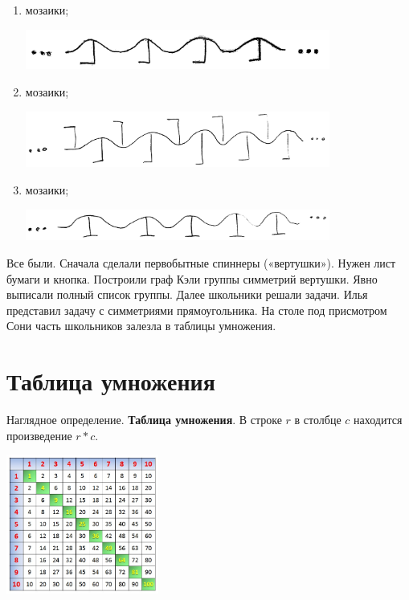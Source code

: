 \documentclass[12pt]{article} %
\begin{document}
\begin{enumerate}[resume]
\begin{enumerate}
  \item мозаики;


  \begin{minipage}[c]{\textwidth}
  \centering
          \includegraphics[width=10cm]{figure/mosaic_b.png}
  \end{minipage}


  \item мозаики;


  \begin{minipage}[c]{\textwidth}
  \centering
          \includegraphics[width=10cm]{figure/mosaic_c.png}
  \end{minipage}


  \item мозаики;


  \begin{minipage}[c]{\textwidth}
  \centering
          \includegraphics[width=10cm]{figure/mosaic_d.png}
  \end{minipage}

\end{enumerate}
\end{enumerate}


Все были. Сначала сделали первобытные спиннеры («вертушки»). Нужен лист бумаги и кнопка. Построили граф Кэли группы симметрий вертушки. Явно выписали полный список группы. Далее школьники решали задачи. Илья представил задачу с симметриями прямоугольника. На столе под присмотром Сони часть школьников залезла в таблицы умножения.

\newpage
\section{Таблица умножения}

Наглядное определение. \textbf{Таблица умножения}. В строке $r$ в столбце $c$ находится произведение $r * c$.

\begin{minipage}[c]{\textwidth}
\centering
        \includegraphics[width=5cm]{figure/table_mult.jpeg}
\end{minipage}
\end{document}
